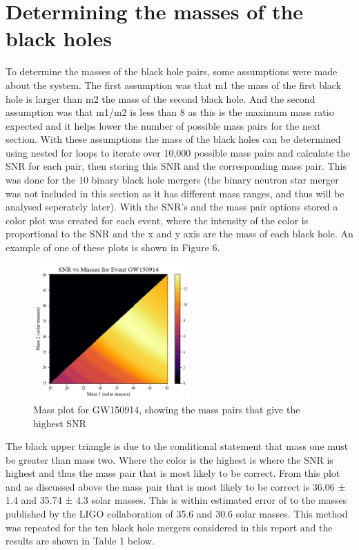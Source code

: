 \documentclass[]{article}
\begin{document}
\section*{Determining the masses of the black holes}
To determine the masses of the black hole pairs, some assumptions were made
about the system. The first assumption was that m1 the mass of the first black hole is larger
than m2 the mass of the second black hole. And the second assumption was that m1/m2 is less than 8
as this is the maximum mass ratio expected and it helps lower the number of possible mass pairs
for the next section. With these assumptions the mass of the black holes can be determined using
nested for loops to iterate over 10,000 possible mass pairs and calculate the SNR for each pair, then storing this
SNR and the corresponding mass pair. This was done for the 10 binary black hole mergers (the binary neutron star
merger was not included in this section as it has different mass ranges, and thus will be analysed seperately
later). With the SNR's and the mass pair options stored a color plot was created for each event, where
the intensity of the color is proportional to the SNR and the x and y axis are the mass of each black hole.
An example of one of these plots is shown in Figure 6.
\begin{figure}[h]
    \includegraphics[width=6cm]{images/snr_color.png}
    \caption{Mass plot for GW150914, showing the mass pairs that give the highest SNR}
    \label{fig:mass_plot}
\end{figure}
\newline
The black upper triangle is due to the conditional statement that mass one must be greater than mass two. Where the
color is the highest is where the SNR is highest and thus the mass pair that is most likely
to be correct. From this plot and as discussed above the mass pair that is most likely to
be correct is 36.06 ± 1.4 and 35.74 ± 4.3 solar masses. This is within estimated error of to the masses published
by the LIGO collaboration of 35.6 and 30.6 solar masses. This method was repeated for the ten
black hole mergers considered in this report and the results are shown in Table 1 below.
\end{document}
